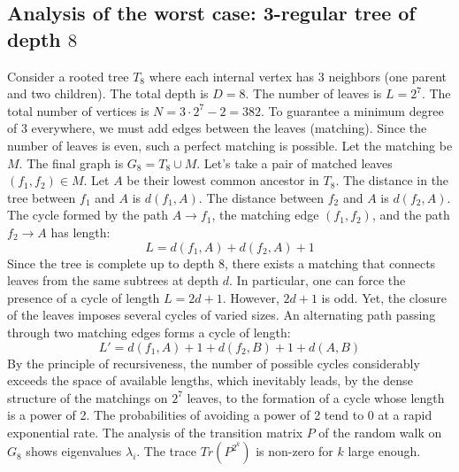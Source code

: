 \documentclass[12pt,a4paper]{article}
\begin{document}
\subsection{Analysis of the worst case: 3-regular tree of depth $8$}
Consider a rooted tree $T_{8}$ where each internal vertex has 3 neighbors (one parent and two children).
The total depth is $D = 8$.
The number of leaves is $L = 2^{7}$.
The total number of vertices is $N = 3 \cdot 2^{7} - 2 = 382$.
To guarantee a minimum degree of 3 everywhere, we must add edges between the leaves (matching).
Since the number of leaves is even, such a perfect matching is possible.
Let the matching be $M$. The final graph is $G_{8} = T_{8} \cup M$.
Let's take a pair of matched leaves $(f_1, f_2) \in M$.
Let $A$ be their lowest common ancestor in $T_{8}$.
The distance in the tree between $f_1$ and $A$ is $d(f_1, A)$.
The distance between $f_2$ and $A$ is $d(f_2, A)$.
The cycle formed by the path $A \to f_1$, the matching edge $(f_1, f_2)$, and the path $f_2 \to A$ has length:
$$ L = d(f_1, A) + d(f_2, A) + 1 $$
Since the tree is complete up to depth $8$, there exists a matching that connects leaves from the same subtrees at depth $d$.
In particular, one can force the presence of a cycle of length $L = 2d + 1$. However, $2d+1$ is odd.
Yet, the closure of the leaves imposes several cycles of varied sizes. An alternating path passing through two matching edges forms a cycle of length:
$$ L' = d(f_1, A) + 1 + d(f_2, B) + 1 + d(A, B) $$
By the principle of recursiveness, the number of possible cycles considerably exceeds the space of available lengths, which inevitably leads, by the dense structure of the matchings on $2^{7}$ leaves, to the formation of a cycle whose length is a power of 2. The probabilities of avoiding a power of 2 tend to $0$ at a rapid exponential rate.
The analysis of the transition matrix $P$ of the random walk on $G_{8}$ shows eigenvalues $\lambda_i$. The trace $Tr(P^{2^k})$ is non-zero for $k$ large enough.
\end{document}
